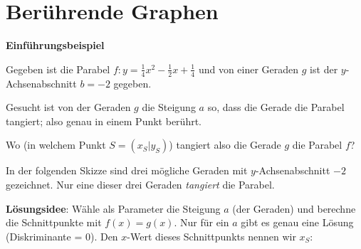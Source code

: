 \section{Berührende Graphen}

\textbf{Einführungsbeispiel}


Gegeben ist die Parabel $f: y=\frac{1}{4}x^2 -\frac12x +\frac14$ und von einer
Geraden $g$ ist der $y$-Achsenabschnitt $b = -2$ gegeben.

Gesucht ist von der Geraden $g$ die Steigung $a$ so, dass die
Gerade die Parabel tangiert; also genau in einem Punkt berührt.

Wo (in welchem Punkt $S=(x_S|y_S)$) tangiert also die Gerade $g$ die Parabel $f$?

In der folgenden Skizze sind drei mögliche Geraden mit $y$-Achsenabschnitt
$-2$ gezeichnet. Nur eine dieser drei Geraden \textit{tangiert} die Parabel.

\newpage
\textbf{Lösungsidee}: Wähle als Parameter die Steigung $a$  (der Geraden)
und berechne die Schnittpunkte mit $f(x) = g(x)$. Nur für ein $a$ gibt
es genau eine Lösung (Diskriminante = 0). Den $x$-Wert dieses
Schnittpunkts nennen wir $x_S$:


